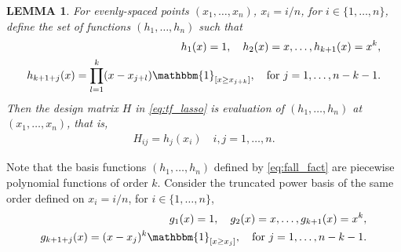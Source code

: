 \documentclass[a4paper]{article}
\newtheorem{lemma}{LEMMA}
\begin{document}
\begin{lemma}
For evenly-spaced points $(x_1,\ldots, x_n)$, $x_i = i/n$, for $i\in\{1,\ldots, n\}$, define the set of functions $(h_1, \ldots, h_n)$ such that
\begin{equation}
\begin{aligned}
h_1(x) = 1, \quad h_2(x) = x, \ldots, h_{k+1}(x) = x^k,\\
h_{k+1+j}(x) = \prod_{l=1}^k (x-x_{j+l})\mathbbm{1}_{[x\geq x_{j+k}]}, \quad \text{for } j = 1,\ldots, n-k-1.
\label{eq:fall_fact}
\end{aligned}
\end{equation}
Then the design matrix $H$ in \eqref{eq:tf_lasso} is evaluation of $(h_1,\ldots, h_n)$ at $(x_1,\ldots, x_n)$, that is,
\begin{align*}
H_{ij} = h_j(x_i) \quad i,j=1,\ldots, n.
\end{align*}
\label{lemma:cont_tf}
\end{lemma}
Note that the basis functions $(h_1,\ldots, h_n)$ defined by \eqref{eq:fall_fact} are piecewise polynomial functions of order $k$. Consider the truncated power basis of the same order defined on $x_i = i/n$, for $i\in\{1,\ldots, n\}$,
\begin{equation}
\begin{aligned}
g_1(x) = 1, \quad g_2(x) = x, \ldots, g_{k+1}(x) = x^k,\\
g_{k+1+j}(x) = (x-x_j)^k\mathbbm{1}_{[x\geq x_j]}, \quad \text{for }j=1,\ldots, n-k-1.
\label{eq:trun_basis}
\end{aligned}
\end{equation}
\end{document}
